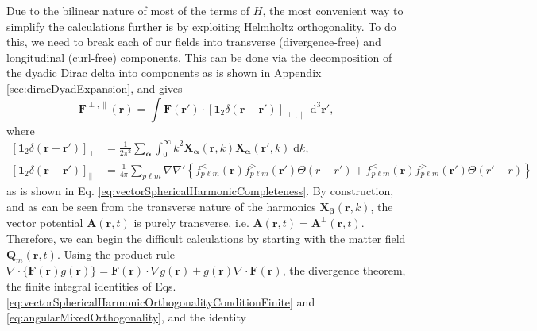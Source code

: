 \documentclass{article}
\begin{document}
Due to the bilinear nature of most of the terms of $H$, the most convenient way to simplify the calculations further is by exploiting Helmholtz orthogonality. To do this, we need to break each of our fields into transverse (divergence-free) and longitudinal (curl-free) components. This can be done via the decomposition of the dyadic Dirac delta into components as is shown in Appendix \ref{sec:diracDyadExpansion}, and gives
\begin{equation}
\mathbf{F}^{\perp,\parallel}(\mathbf{r}) = \int\mathbf{F}(\mathbf{r}')\cdot\left[\bm{1}_2\delta(\mathbf{r} - \mathbf{r}')\right]_{\perp,\parallel}\;\mathrm{d}^3\mathbf{r}',
\end{equation}
where
\begin{equation}
\begin{split}
\left[\bm{1}_2\delta(\mathbf{r} - \mathbf{r}')\right]_\perp &= \frac{1}{2\pi^2}\sum_{\bm{\alpha}}\int_0^\infty k^2\mathbf{X}_{\bm{\alpha}}(\mathbf{r},k)\mathbf{X}_{\bm{\alpha}}(\mathbf{r}',k)\;\mathrm{d}k,\\
\left[\bm{1}_2\delta(\mathbf{r} - \mathbf{r}')\right]_\parallel &= \frac{1}{4\pi}\sum_{p\ell m}\nabla\nabla'\left\{f_{p\ell m}^<(\mathbf{r})f_{p\ell m}^>(\mathbf{r}')\Theta(r - r') + f_{p\ell m}^<(\mathbf{r})f_{p\ell m}^>(\mathbf{r}')\Theta(r' - r)\right\}
\end{split}
\end{equation}
as is shown in Eq. \eqref{eq:vectorSphericalHarmonicCompleteness}. By construction, and as can be seen from the transverse nature of the harmonics $\mathbf{X}_{\bm{\beta}}(\mathbf{r},k)$, the vector potential $\mathbf{A}(\mathbf{r},t)$ is purely transverse, i.e. $\mathbf{A}(\mathbf{r},t) = \mathbf{A}^\perp(\mathbf{r},t)$. Therefore, we can begin the difficult calculations by starting with the matter field $\mathbf{Q}_m(\mathbf{r},t)$. Using the product rule $\nabla\cdot\{\mathbf{F}(\mathbf{r})g(\mathbf{r})\} = \mathbf{F}(\mathbf{r})\cdot\nabla g(\mathbf{r}) + g(\mathbf{r})\nabla\cdot\mathbf{F}(\mathbf{r})$, the divergence theorem, the finite integral identities of Eqs. \eqref{eq:vectorSphericalHarmonicOrthogonalityConditionFinite} and \eqref{eq:angularMixedOrthogonality}, and the identity
\end{document}
